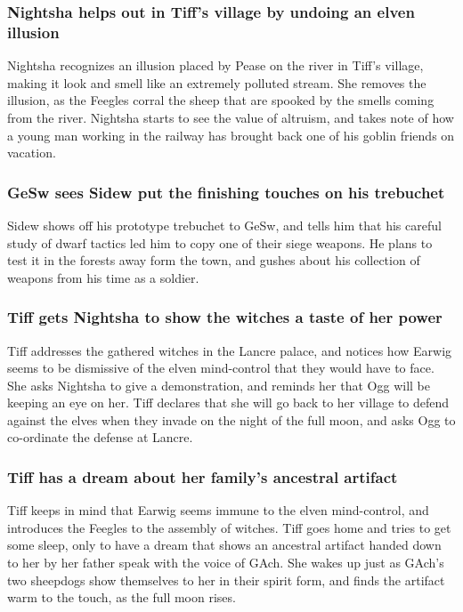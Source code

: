 \subsubsection{\Gls{Nightsha} helps out in \Gls{Tiff}'s village by undoing an elven illusion}
\Gls{Nightsha} recognizes an illusion placed by \Gls{Pease} on the river in \Gls{Tiff}'s village,
making it look and smell like an extremely polluted stream. She removes the illusion, as the
Feegles corral the sheep that are spooked by the smells coming from the river. \Gls{Nightsha} starts
to see the value of altruism, and takes note of how a young man working in the railway has brought
back one of his goblin friends on vacation.

\subsubsection{\Gls{GeSw} sees \Gls{Sidew} put the finishing touches on his trebuchet}
\Gls{Sidew} shows off his prototype trebuchet to \Gls{GeSw}, and tells him that his careful study
of dwarf tactics led him to copy one of their siege weapons. He plans to test it in the forests
away form the town, and gushes about his collection of weapons from his time as a soldier.

\subsubsection{\Gls{Tiff} gets \Gls{Nightsha} to show the witches a taste of her power}
\Gls{Tiff} addresses the gathered witches in the Lancre palace, and notices how \Gls{Earwig} seems
to be dismissive of the elven mind-control that they would have to face. She asks \Gls{Nightsha} to
give a demonstration, and reminds her that \Gls{Ogg} will be keeping an eye on her. \Gls{Tiff}
declares that she will go back to her village to defend against the elves when they invade on the
night of the full moon, and asks \Gls{Ogg} to co-ordinate the defense at Lancre.

\subsubsection{\Gls{Tiff} has a dream about her family's ancestral artifact}
\Gls{Tiff} keeps in mind that \Gls{Earwig} seems immune to the elven mind-control, and introduces
the Feegles to the assembly of witches. \Gls{Tiff} goes home and tries to get some sleep, only to
have a dream that shows an ancestral artifact handed down to her by her father speak with the voice
of \Gls{GAch}. She wakes up just as \Gls{GAch}'s two sheepdogs show themselves to her in their
spirit form, and finds the artifact warm to the touch, as the full moon rises.

